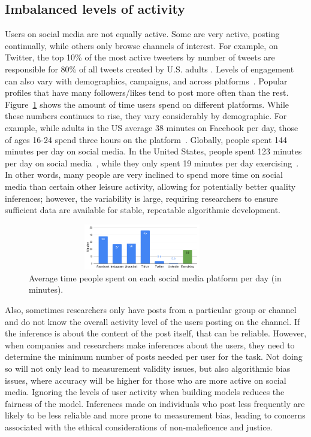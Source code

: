 \documentclass[11pt]{article} %
\begin{document}
\subsection{Imbalanced levels of activity}
Users on social media are not equally active. Some are very active, posting continually, while others only browse channels of interest. For example, on Twitter, the top 10\% of the most active tweeters by number of tweets are responsible for 80\% of all tweets created by U.S. adults \cite{pew_twitter}. Levels of engagement can also vary with demographics, campaigns, and across platforms~\cite{perrin2019}. Popular profiles that have many followers/likes tend to post more often than the rest. Figure~\ref{fig:mins_per_day} shows the amount of time users spend on different platforms. While these numbers continues to rise, they vary considerably by demographic. For example, while adults in the US average 38 minutes on Facebook per day, those of ages 16-24 spend three hours on the platform~\cite{whatagraph2020}. Globally, people spent 144 minutes per day on social media. In the United States, people spent 123 minutes per day on social media~\cite{sm_usage}, while they only spent 19 minutes per day exercising~\cite{american_time_spent2020}. In other words, many people are very inclined to spend more time on social media than certain other leisure activity, allowing for potentially better quality inferences; however, the variability is large, requiring researchers to ensure sufficient data are available for stable, repeatable algorithmic development. 
\begin{figure}
    \centering
    \includegraphics[width=10cm,height = 2cm,natwidth=420,natheight=100]{figs/time_spentExercise.png}
    \caption{Average time people spent on each social media platform per day (in minutes).} 
    \label{fig:mins_per_day}
\end{figure}


Also, sometimes researchers only have posts from a particular group or channel and do not know the overall activity level of the users posting on the channel. If the inference is about the content of the post itself, that can be reliable. However, when companies and researchers make inferences about the users, they need to determine the minimum number of posts needed per user for the task. Not doing so will not only lead to measurement validity issues, but also algorithmic bias issues, where accuracy will be higher for those who are more active on social media. Ignoring the levels of user activity when building models reduces the fairness of the model. Inferences made on individuals who post less frequently are likely to be less reliable and more prone to measurement bias, leading to concerns associated with the ethical considerations of non-maleficence and justice.
\end{document}
